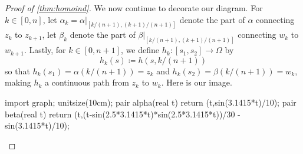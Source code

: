 \begin{proof}[Proof of \autoref{thm:homoind}]
	We now continue to decorate our diagram. For $k\in[0,n]$, let $\alpha_k=\alpha|_{[k/(n+1),(k+1)/(n+1)]}$ denote the part of $\alpha$ connecting $z_k$ to $z_{k+1}$, let $\beta_k$ denote the part of $\beta|_{[k/(n+1),(k+1)/(n+1)]}$ connecting $w_k$ to $w_{k+1}$. Lastly, for $k\in[0,n+1]$, we define $h_k\colon [s_1,s_2]\to\Omega$ by
	\[h_k(s)\coloneqq h(s,k/(n+1))\]
	so that $h_k(s_1)=\alpha(k/(n+1))=z_k$ and $h_k(s_2)=\beta(k/(n+1))=w_k$, making $h_k$ a continuous path from $z_k$ to $w_k$. Here is our image.
	\begin{center}
		\begin{asy}
			import graph;
			unitsize(10cm);
			pair alpha(real t)
			{
				return (t,sin(3.1415*t)/10);
			}
			pair beta(real t)
			{
				return (t,(t-sin(2.5*3.1415*t)*sin(2.5*3.1415*t))/30 - sin(3.1415*t)/10);
			}


\end{asy}
\end{center}
\end{proof}
